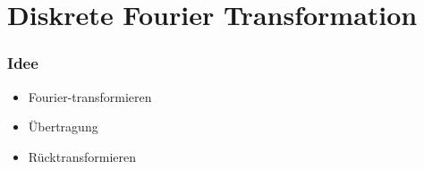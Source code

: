 \documentclass[11pt,aspectratio=169]{beamer}
\begin{document}
\section{Diskrete Fourier Transformation}
	\begin{frame}
		\frametitle{Idee}
		\begin{itemize}
			\item Fourier-transformieren
			\item Übertragung
			\item Rücktransformieren
		\end{itemize}
	\end{frame}
	\begin{frame}
		\begin{figure}
\end{figure}
\end{frame}
\end{document}
